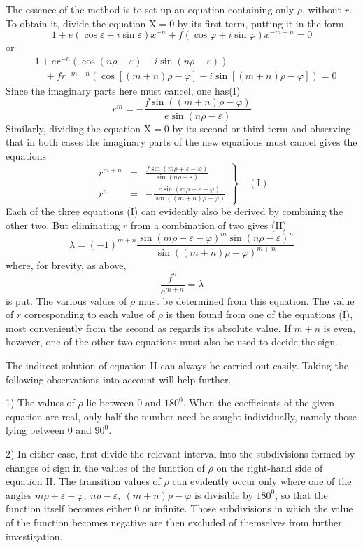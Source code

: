 The essence of the method is to set up an equation containing only $\rho$, without $r$. To obtain it, divide the equation $\mathrm{X}=0$ by its first term, putting it in the form
\[
1+e(\cos\varepsilon+i\sin\varepsilon)x^{-n}+f(\cos\varphi+i\sin\varphi)x^{-m-n}=0
\]
or
\[
\begin{aligned}&1+er^{-n}(\cos(n\rho-\varepsilon)-i\sin(n\rho-\varepsilon))\\
&\quad+fr^{-m-n}(\cos[(m+n)\rho-\varphi]-i\sin[(m+n)\rho-\varphi])=0\end{aligned}
\]
Since the imaginary parts here must cancel, one has\nobreak\hspace{.5em}(I)
\[
r^m=-\frac{f\sin((m+n)\rho-\varphi)}{e\sin(n\rho-\varepsilon)}
\]
Similarly, dividing the equation $\mathrm{X}=0$ by its second or third term and observing that in both cases the imaginary parts of the new equations must cancel gives the equations
\[
\left.
\begin{array}{rcl}
r^{m+n}&=&\displaystyle\frac{f\sin(m\rho+\varepsilon-\varphi)}{\sin(n\rho-\varepsilon)}\\[1.2ex]
r^n&=&\displaystyle-\frac{e\sin(m\rho+\varepsilon-\varphi)}{\sin((m+n)\rho-\varphi)}
\end{array}
\right\}\quad\mathrm{(I)}
\]
Each of the three equations (I) can evidently also be derived by combining the other two. But eliminating $r$ from a combination of two gives (II)
\[
\lambda=(-1)^{m+n}\frac{\sin(m\rho+\varepsilon-\varphi)^m\sin(n\rho-\varepsilon)^n}{\sin((m+n)\rho-\varphi)^{m+n}}
\]
where, for brevity, as above,
\[
\frac{f^n}{e^{m+n}}=\lambda
\]
is put. The various values of $\rho$ must be determined from this equation. The value of $r$ corresponding to each value of $\rho$ is then found from one of the equations (I), most conveniently from the second as regards its absolute value. If $m+n$ is even, however, one of the other two equations must also be used to decide the sign.

The indirect solution of equation II can always be carried out easily. Taking the following observations into account will help further.

1) The values of $\rho$ lie between $0$ and $180^{0}$. When the coefficients of the given equation are real, only half the number need be sought individually, namely those lying between $0$ and $90^{0}$.

2) In either case, first divide the relevant interval into the subdivisions formed by changes of sign in the values of the function of $\rho$ on the right-hand side of equation II. The transition values of $\rho$ can evidently occur only where one of the angles $m\rho+\varepsilon-\varphi,\ n\rho-\varepsilon,\ (m+n)\rho-\varphi$ is divisible by $180^{0}$, so that the function itself becomes either $0$ or infinite. Those subdivisions in which the value of the function becomes negative are then excluded of themselves from further investigation.

